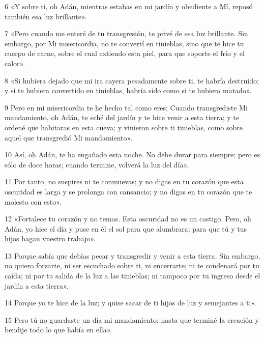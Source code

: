 \par 6 «Y sobre ti, oh Adán, mientras estabas en mi jardín y obediente a Mí, reposó también esa luz brillante».

\par 7 «Pero cuando me enteré de tu transgresión, te privé de esa luz brillante. Sin embargo, por Mi misericordia, no te convertí en tinieblas, sino que te hice tu cuerpo de carne, sobre el cual extiendo esta piel, para que soporte el frío y el calor».

\par 8 «Si hubiera dejado que mi ira cayera pesadamente sobre ti, te habría destruido; y si te hubiera convertido en tinieblas, habría sido como si te hubiera matado».

\par 9 Pero en mi misericordia te he hecho tal como eres; Cuando transgrediste Mi mandamiento, oh Adán, te eché del jardín y te hice venir a esta tierra; y te ordené que habitaras en esta cueva; y vinieron sobre ti tinieblas, como sobre aquel que transgredió Mi mandamiento».

\par 10 Así, oh Adán, te ha engañado esta noche. No debe durar para siempre; pero es sólo de doce horas; cuando termine, volverá la luz del día».

\par 11 Por tanto, no suspires ni te conmuevas; y no digas en tu corazón que esta oscuridad es larga y se prolonga con cansancio; y no digas en tu corazón que te molesto con esto».

\par 12 «Fortalece tu corazón y no temas. Esta oscuridad no es un castigo. Pero, oh Adán, yo hice el día y puse en él el sol para que alumbrara; para que tú y tus hijos hagan vuestro trabajo».

\par 13 Porque sabía que debías pecar y transgredir y venir a esta tierra. Sin embargo, no quiero forzarte, ni ser escuchado sobre ti, ni encerrarte; ni te condenará por tu caída; ni por tu salida de la luz a las tinieblas; ni tampoco por tu ingreso desde el jardín a esta tierra».

\par 14 Porque yo te hice de la luz; y quise sacar de ti hijos de luz y semejantes a ti».

\par 15 Pero tú no guardaste un día mi mandamiento; hasta que terminé la creación y bendije todo lo que había en ella».

